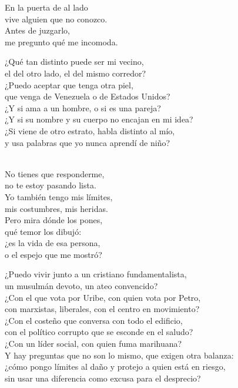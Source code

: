 \begin{lyrics}
En la puerta de al lado\\
vive alguien que no conozco.\\
Antes de juzgarlo,\\
me pregunto qué me incomoda.

¿Qué tan distinto puede ser mi vecino,\\
el del otro lado, el del mismo corredor?\\
¿Puedo aceptar que tenga otra piel,\\
que venga de Venezuela o de Estados Unidos?\\
¿Y si ama a un hombre, o si es una pareja?\\
¿Y si su nombre y su cuerpo no encajan en mi idea?\\
¿Si viene de otro estrato, habla distinto al mío,\\
y usa palabras que yo nunca aprendí de niño?

\\
No tienes que responderme,\\
no te estoy pasando lista.\\
Yo también tengo mis límites,\\
mis costumbres, mis heridas.\\
Pero mira dónde los pones,\\
qué temor los dibujó:\\
¿es la vida de esa persona,\\
o el espejo que me mostró?

¿Puedo vivir junto a un cristiano fundamentalista,\\
un musulmán devoto, un ateo convencido?\\
¿Con el que vota por Uribe, con quien vota por Petro,\\
con marxistas, liberales, con el centro en movimiento?\\
¿Con el costeño que conversa con todo el edificio,\\
con el político corrupto que se esconde en el saludo?\\
¿Con un líder social, con quien fuma marihuana?\\
Y hay preguntas que no son lo mismo, que exigen otra balanza:\\
¿cómo pongo límites al daño y protejo a quien está en riesgo,\\
sin usar una diferencia como excusa para el desprecio?


\end{lyrics}
